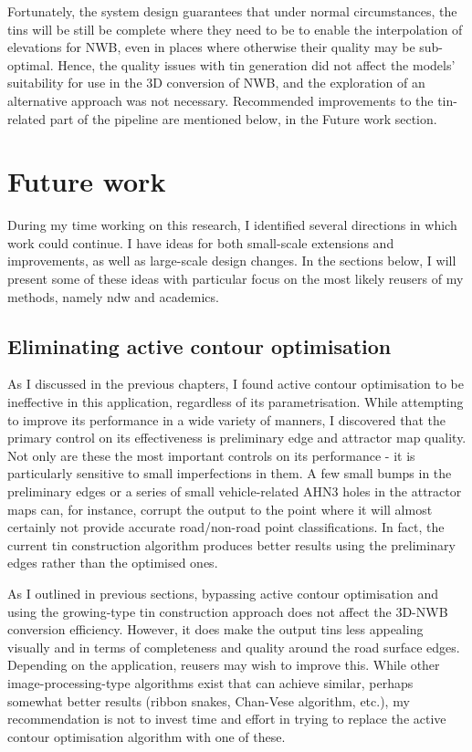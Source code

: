 Fortunately, the system design guarantees that under normal circumstances, the \ac{tin}s will be still be complete where they need to be to enable the interpolation of elevations for NWB, even in places where otherwise their quality may be sub-optimal. Hence, the quality issues with \ac{tin} generation did not affect the models' suitability for use in the 3D conversion of NWB, and the exploration of an alternative approach was not necessary. Recommended improvements to the \ac{tin}-related part of the pipeline are mentioned below, in the Future work section.

\section{Future work}
\label{sec:futurework}

During my time working on this research, I identified several directions in which work could continue. I have ideas for both small-scale extensions and improvements, as well as large-scale design changes. In the sections below, I will present some of these ideas with particular focus on the most likely reusers of my methods, namely \ac{ndw} and academics.

\subsection{Eliminating active contour optimisation}
\label{sub:improvementsactivecontours}

As I discussed in the previous chapters, I found active contour optimisation to be ineffective in this application, regardless of its parametrisation. While attempting to improve its performance in a wide variety of manners, I discovered that the primary control on its effectiveness is preliminary edge and attractor map quality. Not only are these the most important controls on its performance - it is particularly sensitive to small imperfections in them. A few small bumps in the preliminary edges or a series of small vehicle-related AHN3 holes in the attractor maps can, for instance, corrupt the output to the point where it will almost certainly not provide accurate road/non-road point classifications. In fact, the current \ac{tin} construction algorithm produces better results using the preliminary edges rather than the optimised ones.

As I outlined in previous sections, bypassing active contour optimisation and using the growing-type \ac{tin} construction approach does not affect the 3D-NWB conversion efficiency. However, it does make the output \ac{tin}s less appealing visually and in terms of completeness and quality around the road surface edges. Depending on the application, reusers may wish to improve this. While other image-processing-type algorithms exist that can achieve similar, perhaps somewhat better results (ribbon snakes, Chan-Vese algorithm, etc.), my recommendation is not to invest time and effort in trying to replace the active contour optimisation algorithm with one of these.

